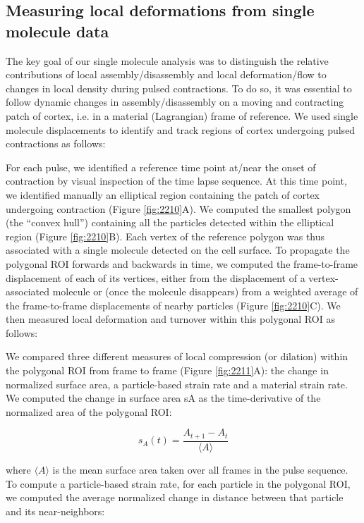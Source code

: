 \subsection{Measuring local deformations from single molecule data}
The key goal of our single molecule analysis was to distinguish the relative contributions of local assembly/disassembly and local deformation/flow to changes in local density during pulsed contractions. To do so, it was essential to follow dynamic changes in assembly/disassembly on a moving and contracting patch of cortex, i.e. in a material (Lagrangian) frame of reference. We used single molecule displacements to identify and track regions of cortex undergoing pulsed contractions as follows:


For each pulse, we identified a reference time point at/near the onset of contraction by visual inspection of the time lapse sequence. At this time point, we identified manually an elliptical region containing the patch of cortex undergoing contraction (Figure \ref{fig:2210}A). We computed the smallest polygon (the “convex hull”) containing all the particles detected within the elliptical region (Figure \ref{fig:2210}B). Each vertex of the reference polygon was thus associated with a single molecule detected on the cell surface. To propagate the polygonal ROI forwards and backwards in time, we computed the frame-to-frame displacement of each of its vertices, either from the displacement of a vertex-associated molecule or (once the molecule disappears) from a weighted average of the frame-to-frame displacements of nearby particles (Figure \ref{fig:2210}C). We then measured local deformation and turnover within this polygonal ROI as follows:






We compared three different measures of local compression (or dilation) within the polygonal ROI from frame to frame (Figure \ref{fig:2211}A):  the change in normalized surface area, a particle-based strain rate and a material strain rate. We computed the change in surface area sA as the time-derivative of the normalized area of the polygonal ROI:

$$s_{A}(t) = \frac{A_{t+1} - A_{t}}{\langle A \rangle}$$

where $\langle A \rangle$ is the mean surface area taken over all frames in the pulse sequence. To compute a particle-based strain rate, for each particle in the polygonal ROI, we computed the average normalized change in distance between that particle and its near-neighbors:



